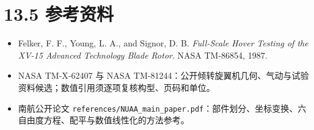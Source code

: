 \documentclass[UTF8,11pt,oneside,openany,fontset=windows]{ctexbook}
\begin{document}
\section{13.5 参考资料}\label{ux53c2ux8003ux8d44ux6599}

\begin{itemize}

\item
  Felker, F. F., Young, L. A., and Signor, D. B. \emph{Full-Scale Hover
  Testing of the XV-15 Advanced Technology Blade Rotor}. NASA TM-86854,
  1987.
\item
  NASA TM-X-62407 与 NASA
  TM-81244：公开倾转旋翼机几何、气动与试验资料候选；数值引用须逐项复核构型、页码和单位。
\item
  南航公开论文
  \texttt{references/NUAA\_main\_paper.pdf}：部件划分、坐标变换、六自由度方程、配平与数值线性化的方法参考。
\end{itemize}

\backmatter
\nocite{*}
\printbibliography[heading=bibintoc,title={参考文献}]
\end{document}
